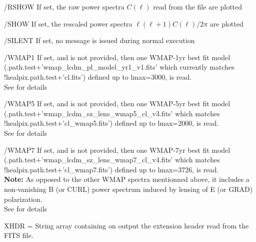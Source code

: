\begin{keywords}
\begin{kwlist}{}
    \item[/RSHOW] %
	If set, the raw power spectra $C(\ell)$ read from the file are plotted
    \item[/SHOW] %
	If set, the rescaled power spectra $\ell(\ell+1)C(\ell)/2\pi$ are plotted
    \item[/SILENT] %
	If set, no message is issued during normal execution
%
    \item[/WMAP1] %
           If set, and  
           is not provided, then one WMAP-1yr best fit
          model
(.path.test+\-'wmap\_lcdm\_pl\_model\_yr1\_v1.fits'
which currently matches !healpix.path.test+'cl.fits') 
          defined up to lmax=3000, is read.\\
          See  for details
%
    \item[/WMAP5] %
           If set, and 
           is not provided, then one WMAP-5yr best fit
          model (.path.test+\-'wmap\_lcdm\_sz\_lens\_wmap5\_cl\_v3.fits'
which matches !healpix.path.test+'cl\_wmap5.fits') 
          defined up to lmax=2000, is read.\\
          See  for details
%
    \item[/WMAP7] %
           If set, and 
           is not provided, then one WMAP-7yr best fit
          model (.path.test+\-'wmap\_lcdm\_sz\_lens\_wmap7\_cl\_v4.fits'
which matches !healpix.path.test+'cl\_wmap7.fits') 
          defined up to lmax=3726, is read.\\
          {\bf Note:} As opposed to the other WMAP spectra mentionned above, it includes
             a non-vanishing B (or CURL) power spectrum 
             induced by lensing of E (or GRAD) polarization.\\
          See  for details
%
    \item[XHDR =] %
	String array containing on output the extension header
      read from the FITS file. 
  \end{kwlist}
\end{keywords}  


